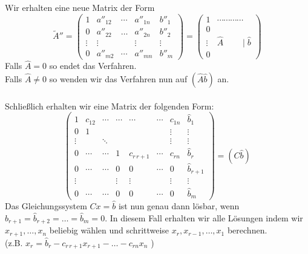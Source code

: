 Wir erhalten eine neue Matrix der Form
\[
\tilde A'' =
\begin{pmatrix}
1 &  a''_{12} & \cdots & a''_{1n} & b''_1 \\
0 &  a''_{22} & \ldots & a''_{2n} & b''_2 \\
\vdots  & \vdots & & \vdots & \vdots \\
0 & a''_{m2} & \cdots & a''_{mn} & b''_m 
\end{pmatrix}
=
\begin{pmatrix}
1 & \cdots\cdots\cdots\cdots \\
0 \\
\vdots & \hat A \quad \quad \mid \hat b \\
0
\end{pmatrix}
\]
Falls \( \hat A =0\) so endet das Verfahren. \\
Falls \( \hat A \not= 0\) so wenden wir das Verfahren nun auf \( ( \hat A \hat b ) \) an. \\
\\
Schließlich erhalten wir eine Matrix der folgenden Form:
\[
\begin{pmatrix}
1 & c_{12} &  \cdots & \cdots & \cdots & \cdots & c_{1n} & \hat b_1 \\
0 & 1 &   &  &  &  & \vdots & \vdots \\
\vdots &  &  \ddots &  &  &  & \vdots & \vdots \\
0 & \cdots &  \cdots & 1 & c_{r \, r+1}  & \cdots & c_{rn} & \hat b_r \\
0 & \cdots &  \cdots & 0 & 0 & \cdots & 0 & \hat b_{r+1} \\
\vdots & & & \vdots & \vdots & & \vdots & \vdots \\
0 & \cdots &  \cdots & 0 & 0 & \cdots & 0 & \hat b_{m} 
\end{pmatrix}
= ( C \hat b )
\]
Das Gleichungssystem \( Cx= \hat b \) ist nun genau dann lösbar, wenn \( \hat b_{r+1} = \hat b_{r+2} = \ldots = \hat b_m = 0\). In diesem Fall erhalten wir alle Lösungen indem wir 
\(x_{r+1}, \ldots, x_n\) beliebig wählen und schrittweise \(x_r, x_{r-1}, \ldots, x_1\) berechnen. \\
(z.B. \(x_r = \hat b_r - c_{r \, r+1} x_{r+1} - \ldots - c_{rn} x_n\) )
